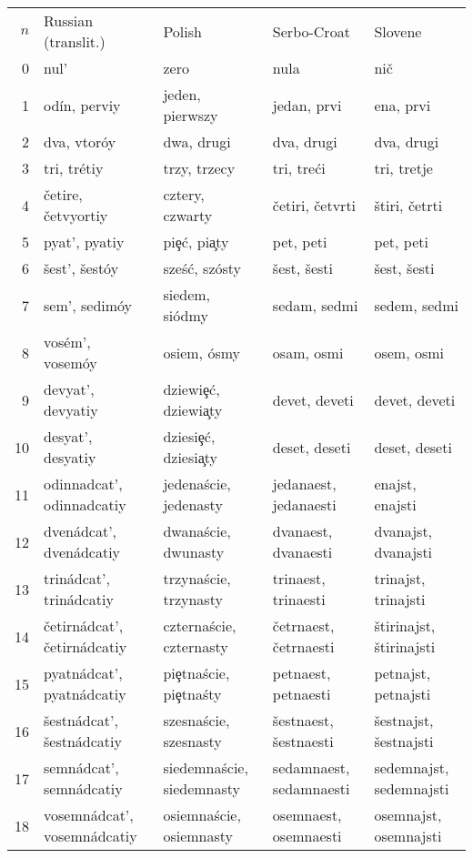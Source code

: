 \documentclass[12pt]{article}
\begin{document}
\begin{tabular}{|r|l|l|l|l|}
$n$ & Russian (translit.) & Polish & Serbo-Croat & Slovene \\
0 & nul' & zero & nula & ni\v{c} \\
1 & od\'in, perviy & jeden, pierwszy & jedan, prvi & ena, prvi \\
2 & dva, vtor\'oy & dwa, drugi & dva, drugi & dva, drugi \\
3 & tri, tr\'etiy & trzy, trzecy & tri, tre\'ci & tri, tretje \\
4 & \v{c}etire, \v{c}etvyortiy & cztery, czwarty & \v{c}etiri, \v{c}etvrti & \v{s}tiri, \v{c}etrti \\
5 & pyat', pyatiy & pi\c{e}\'c, pi\c{a}ty & pet, peti & pet, peti \\
6 & \v{s}est', \v{s}est\'oy & sze\'s\'c, sz\'osty & \v{s}est, \v{s}esti & \v{s}est, \v{s}esti \\
7 & sem', sedim\'oy & siedem, si\'odmy & sedam, sedmi & sedem, sedmi \\
8 & vos\'em', vosem\'oy & osiem, \'osmy & osam, osmi & osem, osmi \\
9 & devyat', devyatiy & dziewi\c{e}\'c, dziewi\c{a}ty & devet, deveti & devet, deveti \\
10 & desyat', desyatiy & dziesi\c{e}\'c, dziesi\c{a}ty & deset, deseti & deset, deseti \\
11 & odinnadcat', odinnadcatiy & jedena\'scie, jedenasty & jedanaest, jedanaesti & enajst, enajsti \\
12 & dven\'adcat', dven\'adcatiy & dwana\'scie, dwunasty & dvanaest, dvanaesti & dvanajst, dvanajsti \\
13 & trin\'adcat', trin\'adcatiy & trzyna\'scie, trzynasty & trinaest, trinaesti & trinajst, trinajsti \\
14 & \v{c}etirn\'adcat', \v{c}etirn\'adcatiy & czterna\'scie, czternasty & \v{c}etrnaest, \v{c}etrnaesti & \v{s}tirinajst, \v{s}tirinajsti \\
15 & pyatn\'adcat', pyatn\'adcatiy & pi\c{e}tna\'scie, pi\c{e}tna\'sty & petnaest, petnaesti & petnajst, petnajsti \\
16 & \v{s}estn\'adcat', \v{s}estn\'adcatiy & szesna\'scie, szesnasty & \v{s}estnaest, \v{s}estnaesti & \v{s}estnajst, \v{s}estnajsti \\
17 & semn\'adcat', semn\'adcatiy & siedemna\'scie, siedemnasty & sedamnaest, sedamnaesti & sedemnajst, sedemnajsti \\
18 & vosemn\'adcat', vosemn\'adcatiy & osiemna\'scie, osiemnasty & osemnaest, osemnaesti & osemnajst, osemnajsti \\

\end{tabular}
\end{document}
